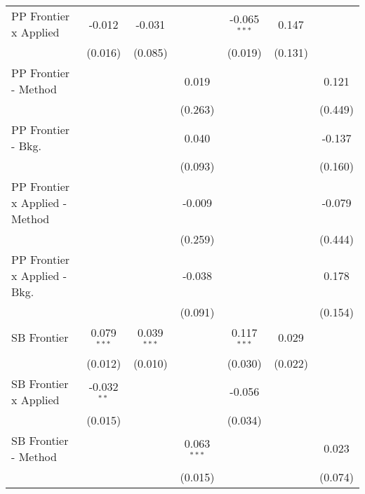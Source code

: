 \begin{tabular}{lcccccc}
   PP Frontier x Applied          & -0.012         & -0.031         &                & -0.065$^{***}$ & 0.147          &   \\   
                                  & (0.016)        & (0.085)        &                & (0.019)        & (0.131)        &   \\   
   PP Frontier - Method           &                &                & 0.019          &                &                & 0.121\\   
                                  &                &                & (0.263)        &                &                & (0.449)\\   
   PP Frontier - Bkg.             &                &                & 0.040          &                &                & -0.137\\   
                                  &                &                & (0.093)        &                &                & (0.160)\\   
   PP Frontier x Applied - Method &                &                & -0.009         &                &                & -0.079\\   
                                  &                &                & (0.259)        &                &                & (0.444)\\   
   PP Frontier x Applied - Bkg.   &                &                & -0.038         &                &                & 0.178\\   
                                  &                &                & (0.091)        &                &                & (0.154)\\   
   SB Frontier                    & 0.079$^{***}$  & 0.039$^{***}$  &                & 0.117$^{***}$  & 0.029          &   \\   
                                  & (0.012)        & (0.010)        &                & (0.030)        & (0.022)        &   \\   
   SB Frontier x Applied          & -0.032$^{**}$  &                &                & -0.056         &                &   \\   
                                  & (0.015)        &                &                & (0.034)        &                &   \\   
   SB Frontier - Method           &                &                & 0.063$^{***}$  &                &                & 0.023\\   
                                  &                &                & (0.015)        &                &                & (0.074)\\   

\end{tabular}
